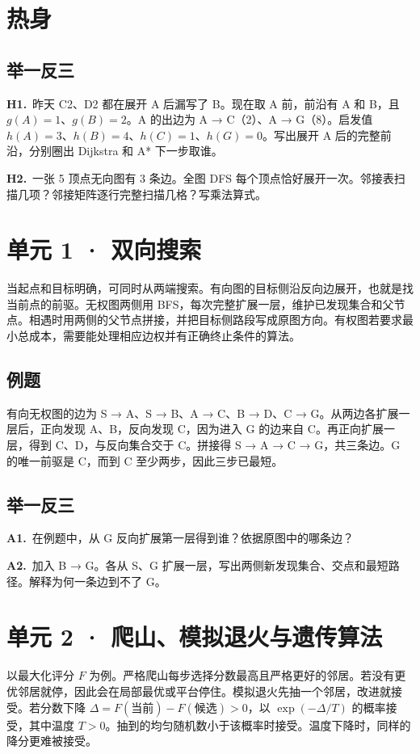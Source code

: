 \documentclass[UTF8,a4paper,11pt]{ctexart}
\newcommand{\PracticeQuestion}[3]{\par\Needspace{4\baselineskip}\noindent\begin{minipage}{\linewidth}\textbf{#1.}\ #2\par\noindent\rule{0pt}{#3mm}\par\end{minipage}\par}
\begin{document}
\section{热身}
\subsection{举一反三}
\PracticeQuestion{H1}{昨天 C2、D2 都在展开 A 后漏写了 B。现在取 A 前，前沿有 A 和 B，且 $g(A)=1$、$g(B)=2$。A 的出边为 A → C（2）、A → G（8）。启发值 $h(A)=3$、$h(B)=4$、$h(C)=1$、$h(G)=0$。写出展开 A 后的完整前沿，分别圈出 Dijkstra 和 A* 下一步取谁。}{35}
\PracticeQuestion{H2}{一张 5 顶点无向图有 3 条边。全图 DFS 每个顶点恰好展开一次。邻接表扫描几项？邻接矩阵逐行完整扫描几格？写乘法算式。}{35}
\clearpage
\section{单元 1 · 双向搜索}
当起点和目标明确，可同时从两端搜索。有向图的目标侧沿反向边展开，也就是找当前点的前驱。无权图两侧用 BFS，每次完整扩展一层，维护已发现集合和父节点。相遇时用两侧的父节点拼接，并把目标侧路段写成原图方向。有权图若要求最小总成本，需要能处理相应边权并有正确终止条件的算法。

\subsection{例题}
有向无权图的边为 S → A、S → B、A → C、B → D、C → G。从两边各扩展一层后，正向发现 A、B，反向发现 C，因为进入 G 的边来自 C。再正向扩展一层，得到 C、D，与反向集合交于 C。拼接得 S → A → C → G，共三条边。G 的唯一前驱是 C，而到 C 至少两步，因此三步已最短。

\subsection{举一反三}
\PracticeQuestion{A1}{在例题中，从 G 反向扩展第一层得到谁？依据原图中的哪条边？}{23}
\PracticeQuestion{A2}{加入 B → G。各从 S、G 扩展一层，写出两侧新发现集合、交点和最短路径。解释为何一条边到不了 G。}{26}
\clearpage
\section{单元 2 · 爬山、模拟退火与遗传算法}
以最大化评分 $F$ 为例。严格爬山每步选择分数最高且严格更好的邻居。若没有更优邻居就停，因此会在局部最优或平台停住。模拟退火先抽一个邻居，改进就接受。若分数下降 $\Delta=F(\text{当前})-F(\text{候选})>0$，以 $\exp(-\Delta/T)$ 的概率接受，其中温度 $T>0$。抽到的均匀随机数小于该概率时接受。温度下降时，同样的降分更难被接受。
\end{document}
